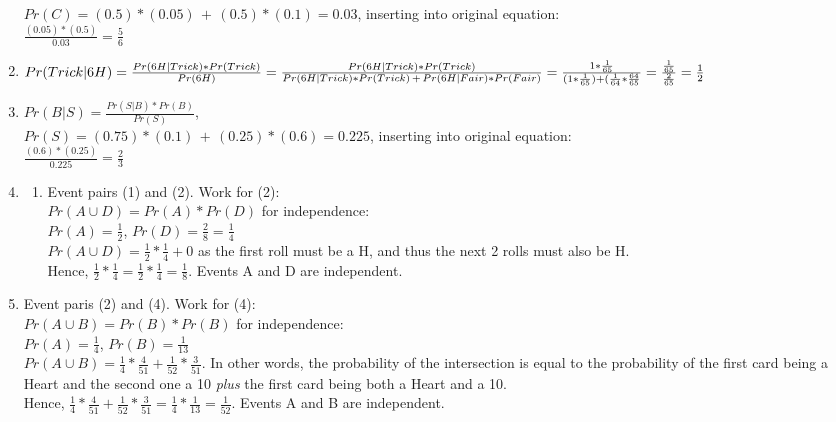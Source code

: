 \documentclass[12pt]{article}
\theoremstyle{plain}
\theoremstyle{definition}
\numberwithin{equation}{theorem}
\begin{document}
\begin{enumerate}
$Pr(C) = (0.5)*(0.05)\,+\,(0.5)*(0.1) = 0.03$, inserting into original equation:\\
$\frac{(0.05)*(0.5)}{0.03} = \frac{5}{6}$
\addtocounter{enumi}{1}
\item $Pr(Trick|6H) = \frac{Pr(6H|Trick)*Pr(Trick)}{Pr(6H)}\\
= \frac{Pr(6H|Trick)*Pr(Trick)}{Pr(6H|Trick)*Pr(Trick)\,+\,Pr(6H|Fair)*Pr(Fair)}\\
= \frac{1*\frac{1}{65}}{(1*\frac{1}{65})+(\frac{1}{64}*\frac{64}{65}}\\
=\frac{\frac{1}{65}}{\frac{2}{65}} = \frac{1}{2}$
\addtocounter{enumi}{1}
\item $Pr(B|S) = \frac{Pr(S|B)*Pr(B)}{Pr(S)}$,\\
$Pr(S) = (0.75)*(0.1)\,+\,(0.25)*(0.6) = 0.225$, inserting into original equation:\\
$\frac{(0.6)*(0.25)}{0.225} = \frac{2}{3}$
\item
	\begin{enumerate}
	\item Event pairs (1) and (2). Work for (2):\\
	$Pr(A\cup D) = Pr(A)*Pr(D)$ for independence:\\
	$Pr(A) = \frac{1}{2}$, $Pr(D) = \frac{2}{8} = \frac{1}{4}$\\
	$Pr(A\cup D) = \frac{1}{2} * \frac{1}{4} + 0$ as the first roll must be a H, and thus the next 2 rolls must also be H.\\
	Hence, $\frac{1}{2} * \frac{1}{4} = \frac{1}{2} * \frac{1}{4} = \frac{1}{8}$. Events A and D are independent.
	\end{enumerate}
\item Event paris (2) and (4). Work for (4):\\
	$Pr(A\cup B) = Pr(B)*Pr(B)$ for independence:\\
	$Pr(A) = \frac{1}{4}$, $Pr(B) = \frac{1}{13}$\\
	$Pr(A\cup B) = \frac{1}{4} * \frac{4}{51} + \frac{1}{52}*\frac{3}{51}$. In other words, the probability of the intersection is equal to the probability of the first card being a Heart and the second one a 10 \textit{plus} the first card being both a Heart and a 10.\\
	Hence, $\frac{1}{4} * \frac{4}{51} + \frac{1}{52}*\frac{3}{51} = \frac{1}{4} * \frac{1}{13} = \frac{1}{52}$. Events A and B are independent.
\end{enumerate}
\end{document}
